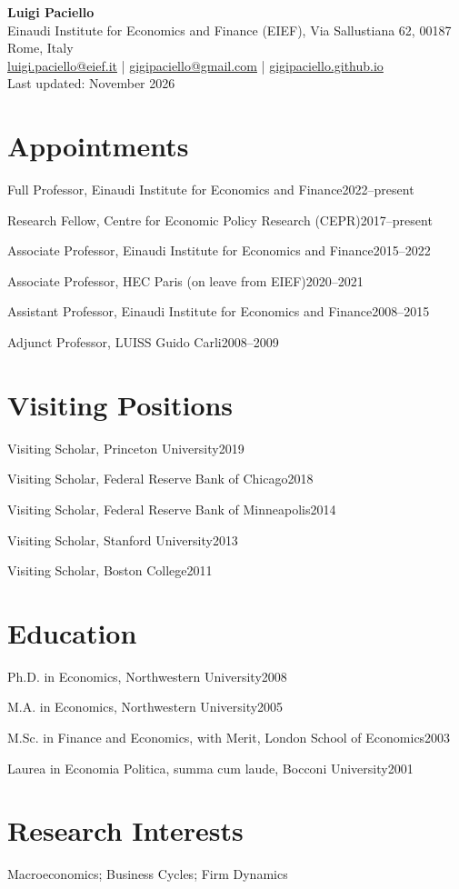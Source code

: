 \documentclass[11pt]{article}
\newcommand{\entry}[2]{\noindent #1\hfill #2\par}
\begin{document}
\begin{center}
{\LARGE\bfseries Luigi Paciello}\\[0.5em]
Einaudi Institute for Economics and Finance (EIEF), Via Sallustiana 62, 00187 Rome, Italy\\
\href{mailto:luigi.paciello@eief.it}{luigi.paciello@eief.it} \;|\;
\href{mailto:gigipaciello@gmail.com}{gigipaciello@gmail.com} \;|\;
\href{https://gigipaciello.github.io}{gigipaciello.github.io}\\[0.3em]{\small Last updated: November 2026}
\end{center}

\section{Appointments}
\entry{Full Professor, Einaudi Institute for Economics and Finance}{2022--present}
\entry{Research Fellow, Centre for Economic Policy Research (CEPR)}{2017--present}
\entry{Associate Professor, Einaudi Institute for Economics and Finance}{2015--2022}
\entry{Associate Professor, HEC Paris (on leave from EIEF)}{2020--2021}
\entry{Assistant Professor, Einaudi Institute for Economics and Finance}{2008--2015}
\entry{Adjunct Professor, LUISS Guido Carli}{2008--2009}

\section{Visiting Positions}
\entry{Visiting Scholar, Princeton University}{2019}
\entry{Visiting Scholar, Federal Reserve Bank of Chicago}{2018}
\entry{Visiting Scholar, Federal Reserve Bank of Minneapolis}{2014}
\entry{Visiting Scholar, Stanford University}{2013}
\entry{Visiting Scholar, Boston College}{2011}

\section{Education}
\entry{Ph.D. in Economics, Northwestern University}{2008}
\entry{M.A. in Economics, Northwestern University}{2005}
\entry{M.Sc. in Finance and Economics, with Merit, London School of Economics}{2003}
\entry{Laurea in Economia Politica, summa cum laude, Bocconi University}{2001}

\section{Research Interests}
Macroeconomics; Business Cycles; Firm Dynamics
\end{document}
